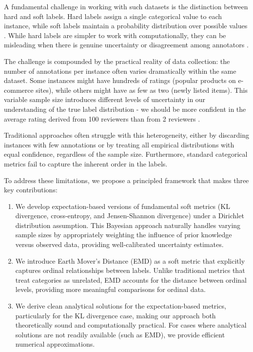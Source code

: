 \documentclass[journal]{IEEEtran}
\begin{document}
A fundamental challenge in working with such datasets is the distinction between hard and soft labels. Hard labels assign a single categorical value to each instance, while soft labels maintain a probability distribution over possible values \cite{peterson2019}. While hard labels are simpler to work with computationally, they can be misleading when there is genuine uncertainty or disagreement among annotators \cite{uma2021}.

The challenge is compounded by the practical reality of data collection: the number of annotations per instance often varies dramatically within the same dataset. Some instances might have hundreds of ratings (popular products on e-commerce sites), while others might have as few as two (newly listed items). This variable sample size introduces different levels of uncertainty in our understanding of the true label distribution - we should be more confident in the average rating derived from 100 reviewers than from 2 reviewers \cite{uma2021}.

Traditional approaches often struggle with this heterogeneity, either by discarding instances with few annotations or by treating all empirical distributions with equal confidence, regardless of the sample size. Furthermore, standard categorical metrics fail to capture the inherent order in the labels.

To address these limitations, we propose a principled framework that makes three key contributions:

\begin{enumerate}
    \item We develop expectation-based versions of fundamental soft metrics (KL divergence, cross-entropy, and Jensen-Shannon divergence) under a Dirichlet distribution assumption. This Bayesian approach naturally handles varying sample sizes by appropriately weighting the influence of prior knowledge versus observed data, providing well-calibrated uncertainty estimates.
    \item We introduce Earth Mover's Distance (EMD) as a soft metric that explicitly captures ordinal relationships between labels. Unlike traditional metrics that treat categories as unrelated, EMD accounts for the distance between ordinal levels, providing more meaningful comparisons for ordinal data.
    \item We derive clean analytical solutions for the expectation-based metrics, particularly for the KL divergence case, making our approach both theoretically sound and computationally practical. For cases where analytical solutions are not readily available (such as EMD), we provide efficient numerical approximations.
\end{enumerate}
\end{document}
